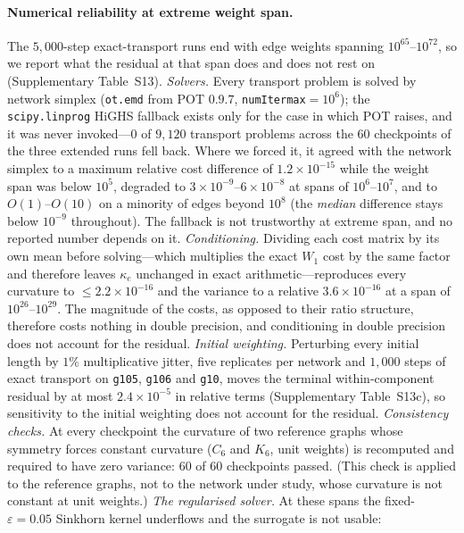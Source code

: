 \documentclass[11pt]{article}
\begin{document}
\paragraph{Numerical reliability at extreme weight span.} The
$5{,}000$-step exact-transport runs end with edge weights spanning
$10^{65}$--$10^{72}$, so we report what the residual at that span does and does
not rest on (Supplementary Table~S13). \emph{Solvers.} Every transport problem
is solved by network simplex (\texttt{ot.emd} from POT $0.9.7$,
\texttt{numItermax}$=10^{6}$); the \texttt{scipy.linprog} {HiGHS} fallback
exists only for the case in which {POT} raises, and it was never invoked---$0$
of $9{,}120$ transport problems across the $60$ checkpoints of the three
extended runs fell back. Where we forced it, it agreed with the network
simplex to a maximum relative cost difference of $1.2\times10^{-15}$ while the
weight span was below $10^{5}$, degraded to $3\times10^{-9}$--$6\times10^{-8}$
at spans of $10^{6}$--$10^{7}$, and to $O(1)$--$O(10)$ on a minority of edges
beyond $10^{8}$ (the \emph{median} difference stays below $10^{-9}$
throughout). The fallback is not trustworthy at extreme span, and no reported
number depends on it. \emph{Conditioning.} Dividing each cost matrix by its own
mean before solving---which multiplies the exact $W_1$ cost by the same
factor and therefore leaves $\kappa_e$ unchanged in exact arithmetic---reproduces
every curvature to $\le2.2\times10^{-16}$ and the variance to a relative
$3.6\times10^{-16}$ at a span of $10^{26}$--$10^{29}$. The magnitude of the
costs, as opposed to their ratio structure, therefore costs nothing in double
precision, and conditioning in double precision does not account for the residual. \emph{Initial weighting.} Perturbing every initial length by $1\%$ multiplicative jitter, five replicates per network and $1{,}000$ steps of exact transport on \texttt{g105}, \texttt{g106} and \texttt{g10}, moves the terminal within-component residual by at most $2.4\times10^{-5}$ in relative terms (Supplementary Table~S13c), so sensitivity to the initial weighting does not account for the residual.
\emph{Consistency checks.} At every checkpoint the curvature of two reference
graphs whose symmetry forces constant curvature ($C_6$ and $K_6$, unit
weights) is recomputed and required to have zero variance: $60$ of $60$
checkpoints passed. (This check is applied to the reference graphs, not to the
network under study, whose curvature is not constant at unit weights.)
\emph{The regularised solver.} At these spans the fixed-$\varepsilon=0.05$
{Sinkhorn} kernel underflows and the surrogate is not usable:
\end{document}
